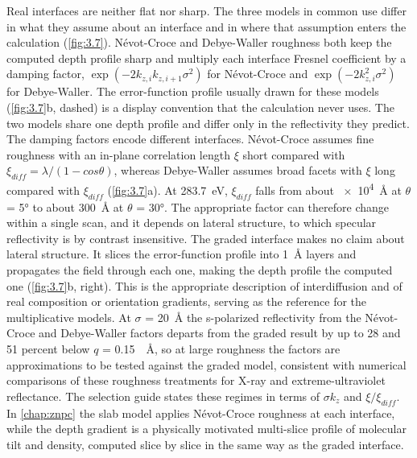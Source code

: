 Real interfaces are neither flat nor sharp. The three models in common use differ in what they assume about an interface and in where that assumption enters the calculation (\cref{fig:3.7}). Névot-Croce and Debye-Waller roughness both keep the computed depth profile sharp and multiply each interface Fresnel coefficient by a damping factor, \(\exp\left( - 2k_{z,i}k_{z,i + 1}\sigma^{2} \right)\) for Névot-Croce\autocite{nevotCaracterisationSurfacesPar1980} and \(\exp\left( - 2k_{z,i}^{2}\sigma^{2} \right)\) for Debye-Waller\autocite{deboerXrayScatteringXray1996a,holyXrayReflectionRough1993a}. The error-function profile usually drawn for these models (\cref{fig:3.7}b, dashed) is a display convention that the calculation never uses. The two models share one depth profile and differ only in the reflectivity they predict. The damping factors encode different interfaces. Névot-Croce assumes fine roughness with an in-plane correlation length \(\xi\) short compared with \(\xi_{diff} = \lambda/(1 - cos\theta)\), whereas Debye-Waller assumes broad facets with \(\xi\) long compared with \(\xi_{diff}\) (\cref{fig:3.7}a). At \qty{283.7}{eV}, \(\xi_{diff}\) falls from about \qty{e4}{\angstrom} at \(\theta\) = \ang{5} to about \qty{300}{\angstrom} at \(\theta\) = \ang{30}. The appropriate factor can therefore change within a single scan, and it depends on lateral structure, to which specular reflectivity is by contrast insensitive. The graded interface makes no claim about lateral structure. It slices the error-function profile into \qty{1}{\angstrom} layers and propagates the field through each one, making the depth profile the computed one (\cref{fig:3.7}b, right). This is the appropriate description of interdiffusion and of real composition or orientation gradients, serving as the reference for the multiplicative models. At \(\sigma\) = \qty{20}{\angstrom} the s-polarized reflectivity from the Névot-Croce and Debye-Waller factors departs from the graded result by up to 28 and 51 percent below \(q\) = \qty{0.15}{\per\angstrom}, so at large roughness the factors are approximations to be tested against the graded model, consistent with numerical comparisons of these roughness treatments for X-ray and extreme-ultraviolet reflectance.\autocite{esashiInfluenceSurfaceInterface2021} The  selection guide states these regimes in terms of \(\sigma k_{z}\) and \(\xi/\xi_{diff}\).\autocite{ALSRSOXSRefloxide2026a} In \cref{chap:znpc} the slab model applies Névot-Croce roughness at each interface, while the depth gradient is a physically motivated multi-slice profile of molecular tilt and density, computed slice by slice in the same way as the graded interface.


